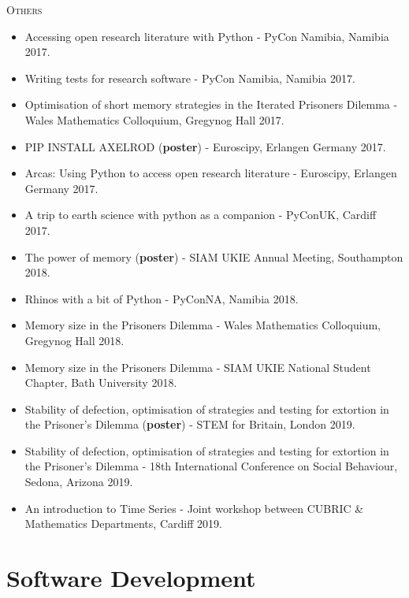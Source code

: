 \textsc{Others}
\begin{itemize}
\item Accessing open research literature with Python - PyCon Namibia, Namibia 2017.
\item Writing tests for research software - PyCon Namibia, Namibia 2017.
\item Optimisation of short memory strategies in the Iterated Prisoners Dilemma - Wales Mathematics Colloquium, Gregynog Hall 2017.
\item PIP INSTALL AXELROD (\textbf{poster}) - Euroscipy, Erlangen Germany 2017.
\item Arcas: Using Python to access open research literature - Euroscipy, Erlangen Germany 2017.
\item A trip to earth science with python as a companion - PyConUK, Cardiff 2017.
\item The power of memory (\textbf{poster}) - SIAM UKIE Annual Meeting, Southampton 2018.
\item Rhinos with a bit of Python - PyConNA, Namibia 2018.
\item Memory size in the Prisoners Dilemma - Wales Mathematics Colloquium, Gregynog Hall 2018.
\item Memory size in the Prisoners Dilemma - SIAM UKIE National Student Chapter, Bath University 2018.
\item Stability of defection, optimisation of strategies and testing for extortion in the Prisoner's Dilemma (\textbf{poster}) - STEM for Britain, London 2019.
\item Stability of defection, optimisation of strategies and testing for extortion in the Prisoner's Dilemma - 18th International Conference on Social Behaviour, Sedona, Arizona 2019.
\item An introduction to Time Series - Joint workshop between CUBRIC \& Mathematics Departments, Cardiff 2019.
\end{itemize}

\section*{Software Development}

